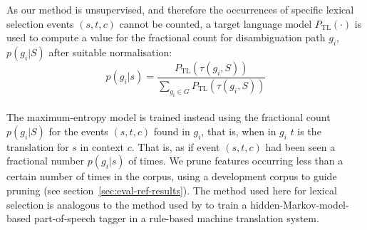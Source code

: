 \documentclass[11pt]{article}
\newcommand{\comment}[1]{\todo{#1}}
\begin{document}
As our method is unsupervised, and therefore the occurrences of
specific lexical selection events \((s,t,c)\) cannot be counted, a
target language model \(P_\mathrm{TL}(\cdot)\) is used to compute a value for
the fractional count for disambiguation path \(g_i\), $p(g_i|S)$ after
suitable normalisation:
\begin{equation}
 \label{eq:normalising}
   p(g_i|s) = \frac{P_\mathrm{TL}(\tau(g_i,S))}{\sum_{g_i \in G} P_\mathrm{TL}(\tau(g_i,S))}
\end{equation}
~\\
The maximum-entropy model is trained instead using the fractional count
$p(g_i|S)$ for the events $(s,t,c)$ found in \(g_i\), that is, when in
\(g_i\) $t$ is the translation for \(s\) in context \(c\). That is, as
if event $(s,t,c)$ had been seen a fractional number $p(g_i|s)$ of
times. We prune features occurring less than a certain number of times 
in the corpus, using a development corpus to guide pruning (see section~\ref{sec:eval-ref-results}).
The method used here
for lexical selection is analogous to the method used by
\cite{sanchez08b} to train a hidden-Markov-model-based part-of-speech
tagger in a rule-based machine translation system. 
% 
\end{document}
